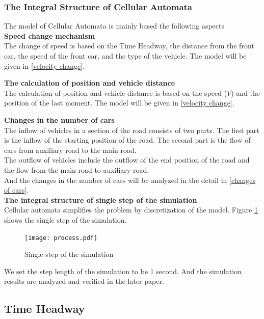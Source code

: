 \documentclass{mcmthesis}
\begin{document}
\subsubsection{The Integral Structure of Cellular Automata}
The model of Cellular Automata is mainly based the following aspects\\

\indent\textbf{Speed change mechanism\\}
\indent The change of speed is based on the Time Headway, the distance from the front car, the speed of the front car, and the type of the vehicle. The model will be given in \ref{velocity change}.

\indent\textbf{The calculation of position and vehicle distance\\}
\indent The calculation of position and vehicle distance is based on the speed ($V$) and the position of the last moment. The model will be given in \ref{velocity change}.

\indent\textbf{Changes in the number of cars\\}
\indent The inflow of vehicles in a section of the road consists of two parts. The first part is the inflow of the starting position of the road. The second part is the flow of cars from auxiliary road to the main road. \\
\indent The outflow of vehicles include the outflow of the end position of the road and the flow from the main road to auxiliary road.\\
\indent And the changes in the number of cars will be analyzed in the detail in \ref{changes of cars}.\\

\indent\textbf{The integral structure of single step of the simulation\\}
\indent Cellular automata simplifies the problem by discretization of the model. Figure \ref{process} shows the single step of the simulation.
\begin{figure}[H]	%
	\centerline{\texttt{[image: process.pdf]}}
	\caption{Single step of the simulation}
	\label{process}
\end{figure}
\indent We set the step length of the simulation to be 1 second. And the simulation results are analyzed and verified in the later paper.
\subsection{Time Headway}
\label{headway}
\end{document}
